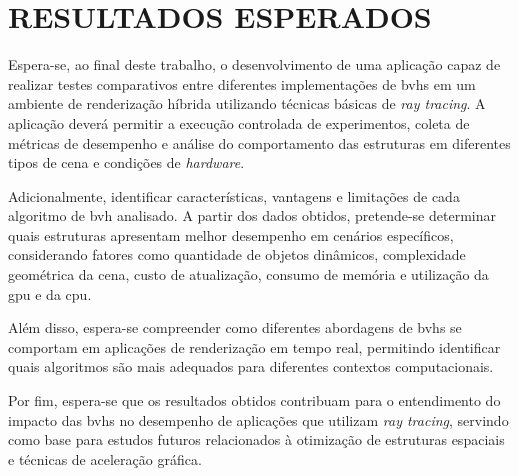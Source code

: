 \chapter{RESULTADOS ESPERADOS}

Espera-se, ao final deste trabalho, o desenvolvimento de uma aplicação capaz de realizar testes comparativos entre diferentes implementações de \glspl{bvh} em um ambiente de renderização híbrida utilizando técnicas básicas de \textit{ray tracing}. A aplicação deverá permitir a execução controlada de experimentos, coleta de métricas de desempenho e análise do comportamento das estruturas em diferentes tipos de cena e condições de \textit{hardware}.

Adicionalmente, identificar características, vantagens e limitações de cada algoritmo de \gls{bvh} analisado. A partir dos dados obtidos, pretende-se determinar quais estruturas apresentam melhor desempenho em cenários específicos, considerando fatores como quantidade de objetos dinâmicos, complexidade geométrica da cena, custo de atualização, consumo de memória e utilização da \gls{gpu} e da \gls{cpu}.

Além disso, espera-se compreender como diferentes abordagens de \glspl{bvh} se comportam em aplicações de renderização em tempo real, permitindo identificar quais algoritmos são mais adequados para diferentes contextos computacionais.

Por fim, espera-se que os resultados obtidos contribuam para o entendimento do impacto das \glspl{bvh} no desempenho de aplicações que utilizam \textit{ray tracing}, servindo como base para estudos futuros relacionados à otimização de estruturas espaciais e técnicas de aceleração gráfica.